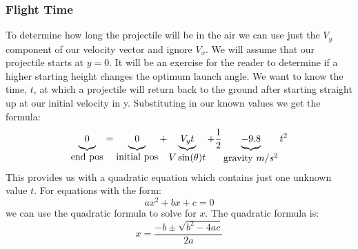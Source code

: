 \documentclass[10pt,a4paper]{article}
\begin{document}
	\subsubsection{Flight Time}
		To determine how long the projectile will be in the air we can use just the $V_y$ component of our velocity vector and ignore $V_x$.
		We will assume that our projectile starts at $y=0$.
		It will be an exercise for the reader to determine if a higher starting height changes the optimum launch angle.
		We want to know the time, $t$, at which a projectile will return back to the ground after starting straight up at our initial velocity in y.
		Substituting in our known values we get the formula:
		\[\underbrace{0		\rule[-3pt]{0pt}{5pt}}_{\mbox{end pos}}
		  = \underbrace{0 		\rule[-3pt]{0pt}{5pt}}_{\mbox{initial pos}}
		  + \underbrace{V_yt	\rule[-3pt]{0pt}{5pt}}_{\mbox{$V\sin(\theta)t$}}
		  + \frac{1}{2}
		  \underbrace{-9.8		\rule[-3pt]{0pt}{5pt}}_{\mbox{gravity $m/s^2$}}
		  t^2  \]
		This provides us with a quadratic equation which contains just one unknown value $t$.
		For equations with the form:
		\begin{equation}
			ax^2 + bx + c = 0
		\end{equation}
		we can use the quadratic formula to solve for $x$.
		The quadratic formula is:
		\begin{equation}
			x = \frac{-b \pm \sqrt{b^2 - 4ac} }{2a}
			\label{eq:quadraticFormula}
		\end{equation}
		
		
		 
		
\end{document}
